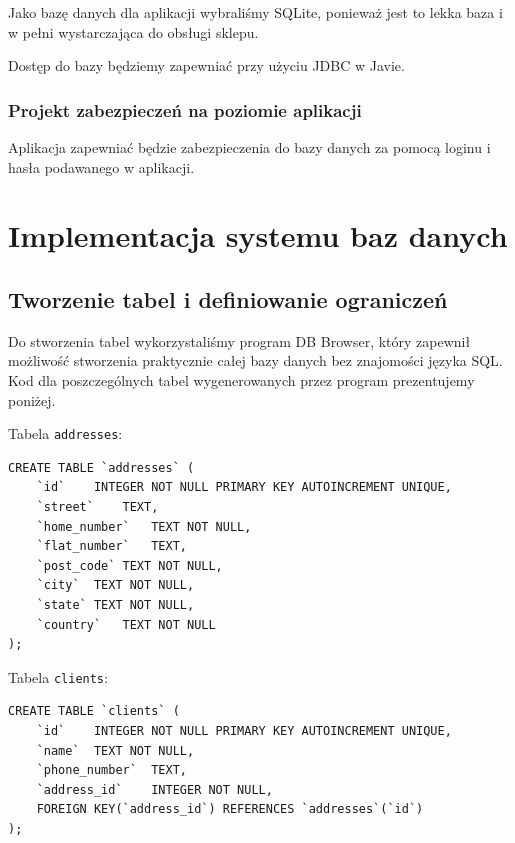 Jako bazę danych dla aplikacji wybraliśmy SQLite, ponieważ jest to lekka baza i w pełni wystarczająca do obsługi sklepu.

Dostęp do bazy będziemy zapewniać przy użyciu JDBC w Javie.

\subsubsection{Projekt zabezpieczeń na poziomie aplikacji}

Aplikacja zapewniać będzie zabezpieczenia do bazy danych za pomocą loginu i hasła podawanego w aplikacji.

\section{Implementacja systemu baz danych}
\subsection{Tworzenie tabel i definiowanie ograniczeń}

Do stworzenia tabel wykorzystaliśmy program DB Browser, który zapewnił możliwość stworzenia praktycznie całej bazy danych bez znajomości języka SQL. Kod dla poszczególnych tabel wygenerowanych przez program prezentujemy poniżej.

Tabela \lstinline|addresses|:

\begin{lstlisting}[style=SQLite]
CREATE TABLE `addresses` (
	`id`	INTEGER NOT NULL PRIMARY KEY AUTOINCREMENT UNIQUE,
	`street`	TEXT,
	`home_number`	TEXT NOT NULL,
	`flat_number`	TEXT,
	`post_code`	TEXT NOT NULL,
	`city`	TEXT NOT NULL,
	`state`	TEXT NOT NULL,
	`country`	TEXT NOT NULL
);
\end{lstlisting}

Tabela \lstinline|clients|:

\begin{lstlisting}[style=SQLite]
CREATE TABLE `clients` (
	`id`	INTEGER NOT NULL PRIMARY KEY AUTOINCREMENT UNIQUE,
	`name`	TEXT NOT NULL,
	`phone_number`	TEXT,
	`address_id`	INTEGER NOT NULL,
	FOREIGN KEY(`address_id`) REFERENCES `addresses`(`id`)
);
\end{lstlisting}

